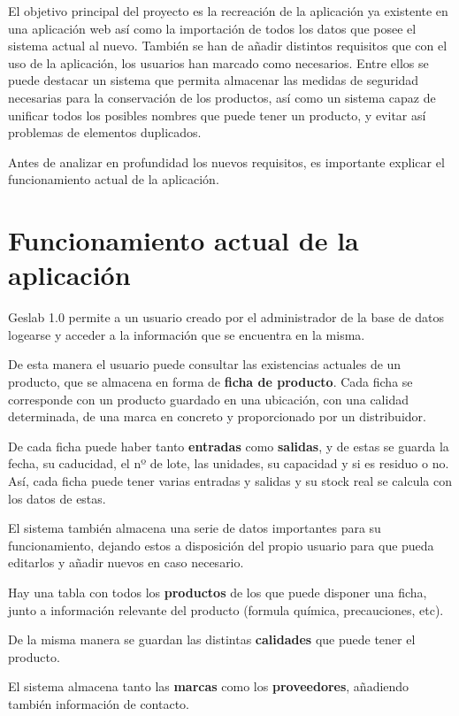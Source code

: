 
El objetivo principal del proyecto es la recreación de la aplicación ya existente en una aplicación web así como la importación de todos los datos que posee el sistema actual al nuevo. También se han de añadir distintos requisitos que con el uso de la aplicación, los usuarios han marcado como necesarios. Entre ellos se puede destacar un sistema que permita almacenar las medidas de seguridad necesarias para la conservación de los productos, así como un sistema capaz de unificar todos los posibles nombres que puede tener un producto, y evitar así problemas de elementos duplicados.

Antes de analizar en profundidad los nuevos requisitos, es importante explicar el funcionamiento actual de la aplicación.


\section{Funcionamiento actual de la aplicación}

Geslab 1.0 permite a un usuario creado por el administrador de la base de datos logearse y acceder a la información que se encuentra en la misma.

De esta manera el usuario puede consultar las existencias actuales de un producto, que se almacena en forma de \textbf{ficha de producto}. Cada ficha se corresponde con un producto guardado en una ubicación, con una calidad determinada, de una marca en concreto y proporcionado por un distribuidor.

De cada ficha puede haber tanto \textbf{entradas} como \textbf{salidas}, y de estas se guarda la fecha, su caducidad, el nº de lote, las unidades, su capacidad y si es residuo o no. Así, cada ficha puede tener varias entradas y salidas y su stock real se calcula con los datos de estas.

El sistema también almacena una serie de datos importantes para su funcionamiento, dejando estos a disposición del propio usuario para que pueda editarlos y añadir nuevos en caso necesario.   

Hay una tabla con todos los \textbf{productos} de los que puede disponer una ficha, junto a información relevante del producto (formula química, precauciones, etc).

De la misma manera se guardan las distintas \textbf{calidades} que puede tener el producto.

El sistema almacena tanto las \textbf{marcas} como los \textbf{proveedores}, añadiendo también información de contacto.

